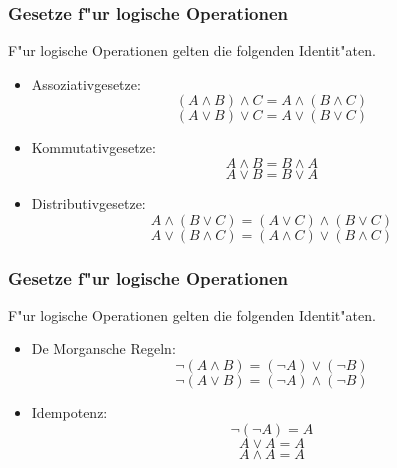 \documentclass{beamer}
\begin{document}
\begin{frame}
  \frametitle{Gesetze f"ur logische Operationen}
  F"ur logische Operationen gelten die folgenden Identit"aten. 
  \begin{itemize}
    \item Assoziativgesetze: \[(A\wedge B)\wedge C = A\wedge(B\wedge C)\] \[(A\vee B)\vee C = A\vee(B\vee C)\]
    \item Kommutativgesetze: \[A\wedge B = B\wedge A\]\[A\vee B = B\vee A\]
    \item Distributivgesetze: \[A \wedge (B\vee C) = (A\vee C)\wedge (B\vee C)\] \[A\vee (B\wedge C) = (A\wedge C)\vee (B\wedge C)\]
  \end{itemize}
   
\end{frame}
\begin{frame}
  \frametitle{Gesetze f"ur logische Operationen}
  F"ur logische Operationen gelten die folgenden Identit"aten. 
  \begin{itemize}
    \item De Morgansche Regeln: \[\neg(A\wedge B) = (\neg A)\vee(\neg B)\]\[\neg(A\vee B) = (\neg A)\wedge(\neg B)\]
    \item Idempotenz: \[\neg(\neg A) = A\]\[A\vee A = A\]\[A\wedge A = A\]
  \end{itemize}
   
\end{frame}

\end{document}
